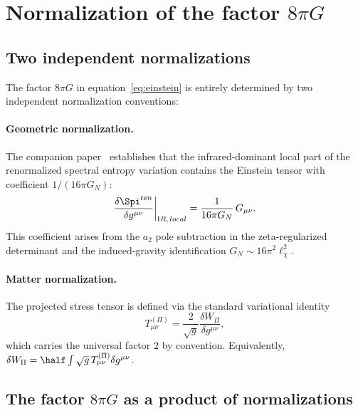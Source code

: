 \section{Normalization of the factor \texorpdfstring{$8\pi G$}{8piG}}
  \label{sec:normalization}

  \subsection{Two independent normalizations}
    \label{subsec:two-norms}

    The factor $8\pi G$ in equation~\eqref{eq:einstein} is entirely determined by
    two independent normalization conventions:

    \paragraph{Geometric normalization.}
      The companion paper~\cite{Gravity20} establishes that the infrared-dominant local
      part of the renormalized spectral entropy variation contains the Einstein tensor
      with coefficient $1/(16\pi G_N)$:
    \begin{equation}
      \frac{\delta\Spi^{\mathrm ren}}{\delta g^{\mu\nu}}\bigg|_{\mathrm IR,\,local}
      = \frac{1}{16\pi G_N}\,G_{\mu\nu}.
      \label{eq:geom-norm}
      \end{equation}
      This coefficient arises from the $a_2$ pole subtraction in the zeta-regularized
      determinant and the induced-gravity identification $G_N \sim 16\pi^2\ell_\chi^2$.

    \paragraph{Matter normalization.}
      The projected stress tensor is defined via the standard variational identity
    \begin{equation}
      T^{(\Pi)}_{\mu\nu} = \frac{2}{\sqrt{g}}
      \frac{\delta W_\Pi}{\delta g^{\mu\nu}},
      \label{eq:matter-norm}
      \end{equation}
      which carries the universal factor $2$ by convention.
      Equivalently, $\delta W_\Pi = \half\int\sqrt{g}\,T^{(\Pi)}_{\mu\nu}\delta g^{\mu\nu}$.

\subsection{The factor $8\pi G$ as a product of normalizations}
  \label{subsec:8piG}

